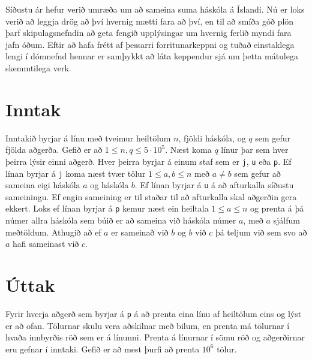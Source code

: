
Síðustu ár hefur verið umræða um að sameina suma
háskóla á Íslandi. Nú er loks verið að leggja drög að því
hvernig mætti fara að því, en til að smíða góð plön þarf
skipulagsnefndin að geta fengið upplýsingar um hvernig
ferlið myndi fara jafn óðum. Eftir að hafa frétt af
þessarri forritunarkeppni og tuðað einstaklega lengi í
dómnefnd hennar er samþykkt að láta keppendur sjá um þetta
mátulega skemmtilega verk.

\section*{Inntak}

Inntakið byrjar á línu með tveimur heiltölum $n$, fjöldi
háskóla, og $q$ sem gefur fjölda aðgerða.
Gefið er að $1 \leq n, q \leq 5 \cdot 10^5$.
Næst koma $q$ línur þar sem hver þeirra lýsir einni aðgerð.
Hver þeirra byrjar á einum staf sem er \texttt{j},
\texttt{u} eða \texttt{p}. Ef línan byrjar á \texttt{j}
koma næst tvær tölur $1 \leq a, b \leq n$ með $a \neq b$
sem gefur að sameina eigi háskóla $a$ og háskóla $b$.
Ef línan byrjar á \texttt{u} á að afturkalla síðustu
sameiningu. Ef engin sameining er til staðar til að afturkalla
skal aðgerðin gera ekkert. Loks ef línan byrjar á \texttt{p} kemur
næst ein heiltala $1 \leq a \leq n$ og prenta á þá númer
allra háskóla sem búið er að sameina við háskóla númer $a$,
með $a$ sjálfum meðtöldum.
Athugið að ef $a$ er sameinað við $b$ og $b$ við $c$ þá
teljum við sem svo að $a$ hafi sameinast við $c$.

\section*{Úttak}

Fyrir hverja aðgerð sem byrjar á \texttt{p} á að prenta
eina línu af heiltölum eins og lýst er að ofan.
Tölurnar skulu vera aðskilnar með bilum, en prenta má
tölurnar í hvaða innbyrðis röð sem er á línunni.
Prenta á línurnar í sömu röð og aðgerðirnar eru gefnar
í inntaki.
Gefið er að mest þurfi að prenta $10^6$ tölur.
